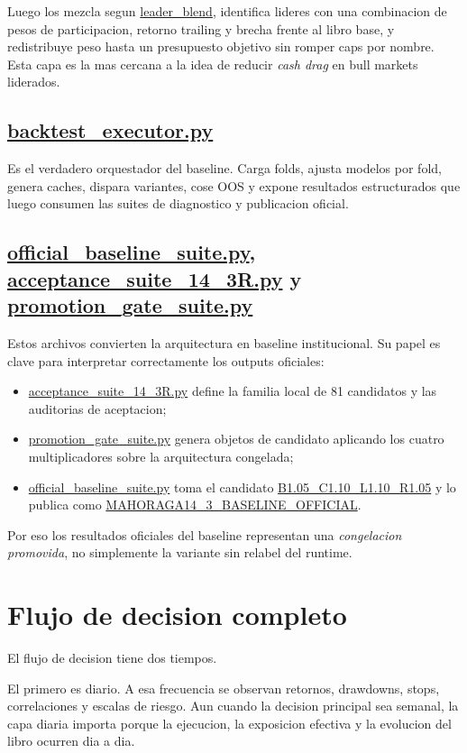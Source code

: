 \documentclass[11pt,letterpaper]{article}
\newcommand{\code}[1]{{\urlstyle{tt}\url{#1}}}
\newcommand{\officiallabel}{\code{MAHORAGA14_3_BASELINE_OFFICIAL}}
\newcommand{\officialcandidate}{\code{B1.05_C1.10_L1.10_R1.05}}
\begin{document}
Luego los mezcla segun \code{leader_blend}, identifica lideres con una combinacion de pesos de participacion, retorno trailing y brecha frente al libro base, y redistribuye peso hasta un presupuesto objetivo sin romper caps por nombre. Esta capa es la mas cercana a la idea de reducir \emph{cash drag} en bull markets liderados.

\subsection{\code{backtest_executor.py}}
Es el verdadero orquestador del baseline. Carga folds, ajusta modelos por fold, genera caches, dispara variantes, cose OOS y expone resultados estructurados que luego consumen las suites de diagnostico y publicacion oficial.

\subsection{\code{official_baseline_suite.py}, \code{acceptance_suite_14_3R.py} y \code{promotion_gate_suite.py}}
Estos archivos convierten la arquitectura en baseline institucional. Su papel es clave para interpretar correctamente los outputs oficiales:

\begin{itemize}
    \item \code{acceptance_suite_14_3R.py} define la familia local de 81 candidatos y las auditorias de aceptacion;
    \item \code{promotion_gate_suite.py} genera objetos de candidato aplicando los cuatro multiplicadores sobre la arquitectura congelada;
    \item \code{official_baseline_suite.py} toma el candidato \officialcandidate{} y lo publica como \officiallabel.
\end{itemize}

Por eso los resultados oficiales del baseline representan una \emph{congelacion promovida}, no simplemente la variante sin relabel del runtime.

\section{Flujo de decision completo}
El flujo de decision tiene dos tiempos.

El primero es diario. A esa frecuencia se observan retornos, drawdowns, stops, correlaciones y escalas de riesgo. Aun cuando la decision principal sea semanal, la capa diaria importa porque la ejecucion, la exposicion efectiva y la evolucion del libro ocurren dia a dia.
\end{document}
